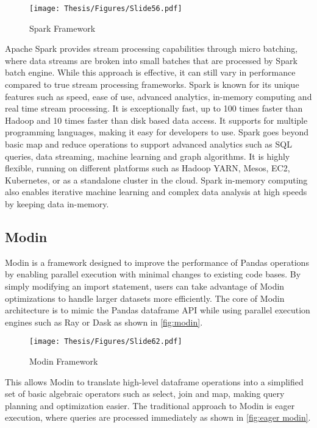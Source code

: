 \begin{figure}[h]
\centering
\texttt{[image: Thesis/Figures/Slide56.pdf]}
\caption{\label{fig:spark}Spark Framework \cite{ketu2020performance}}
\end{figure}

Apache Spark provides stream processing capabilities through micro batching, where data streams are broken into small batches that are processed by Spark batch engine. While this approach is effective, it can still vary in performance compared to true stream processing frameworks. Spark is known for its unique features such as speed, ease of use, advanced analytics, in-memory computing and real time stream processing. It is exceptionally fast, up to 100 times faster than Hadoop and 10 times faster than disk based data access. It supports for multiple programming languages, making it easy for developers to use. Spark goes beyond basic map and reduce operations to support advanced analytics such as SQL queries, data streaming, machine learning and graph algorithms. It is highly flexible, running on different platforms such as Hadoop YARN, Mesos, EC2, Kubernetes, or as a standalone cluster in the cloud. Spark in-memory computing also enables iterative machine learning and complex data analysis at high speeds by keeping data in-memory. \cite{shaikh2019apache}

\subsection{Modin}

Modin is a framework designed to improve the performance of Pandas operations by enabling parallel execution with minimal changes to existing code bases. By simply modifying an import statement, users can take advantage of Modin optimizations to handle larger datasets more efficiently. The core of Modin architecture is to mimic the Pandas dataframe API while using parallel execution engines such as Ray or Dask as shown in \autoref{fig:modin}. \cite{shi2021leveraging}

\clearpage 

\begin{figure}[h]
\centering
\texttt{[image: Thesis/Figures/Slide62.pdf]}
\caption{\label{fig:modin}Modin Framework \cite{shi2021leveraging}}
\end{figure}



This allows Modin to translate high-level dataframe operations into a simplified set of basic algebraic operators such as select, join and map, making query planning and optimization easier. The traditional approach to Modin is eager execution, where queries are processed immediately as shown in \autoref{fig:eager modin}. \cite{shi2021leveraging}



